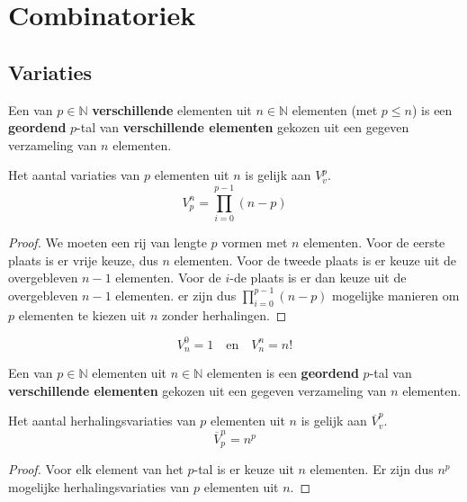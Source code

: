\documentclass[main.tex]{subfiles}
\begin{document}
\chapter{Combinatoriek}
\label{cha:combinatoriek}


\section{Variaties}
\label{sec:variaties}

\begin{de}
  Een  van $p\in \mathbb{N}$ \textbf{verschillende} elementen uit $n\in \mathbb{N}$ elementen (met $p \le n$) is een \textbf{geordend} $p$-tal van \textbf{verschillende elementen} gekozen uit een gegeven verzameling van $n$ elementen.    
\end{de}

\begin{st}
  Het aantal variaties van $p$ elementen uit $n$ is gelijk aan $V_{v}^{p}$.
  \[
  V_{p}^{n} = \prod_{i=0}^{p-1}(n-p)
  \]

  \begin{proof}
    We moeten een rij van lengte $p$ vormen met $n$ elementen.
    Voor de eerste plaats is er vrije keuze, dus $n$ elementen.
    Voor de tweede plaats is er keuze uit de overgebleven $n-1$ elementen.
    Voor de $i$-de plaats is er dan keuze uit de overgebleven $n-1$ elementen.
    er zijn dus $\prod_{i=0}^{p-1}(n-p)$ mogelijke manieren om $p$ elementen te kiezen uit $n$ zonder herhalingen.
  \end{proof}
\end{st}

\begin{ei}
  \[ V_{n}^{0} = 1 \quad\text{en}\quad V_{n}^{n} = n! \]
\end{ei}

\begin{de}
  Een  van $p\in \mathbb{N}$ elementen uit $n\in \mathbb{N}$ elementen is een \textbf{geordend} $p$-tal van \textbf{verschillende elementen} gekozen uit een gegeven verzameling van $n$ elementen.  
\end{de}

\begin{st}
  Het aantal herhalingsvariaties van $p$ elementen uit $n$ is gelijk aan $\overline{V}_{v}^{p}$.
  \[
  \overline{V}_{p}^{n} = n^{p}
  \]

  \begin{proof}
    Voor elk element van het $p$-tal is er keuze uit $n$ elementen. 
    Er zijn dus $n^{p}$ mogelijke herhalingsvariaties van $p$ elementen uit $n$.
  \end{proof}
\end{st}
\end{document}
